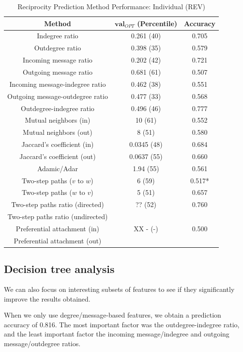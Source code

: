 \documentclass[conference]{IEEEtran}
\begin{document}
\begin{table}[!t]
\renewcommand{\arraystretch}{1.3}
\caption{Reciprocity Prediction Method Performance: Individual (REV)}
\label{table_recresults_indiv}
\centering
\begin{tabular}{|c||c|c|}
\hline
\bf{Method} & $\mathbf{val}_{OPT}$ (Percentile) & \bf{Accuracy} \\
\hline
Indegree ratio & 0.261 (40) & 0.705 \\
Outdegree ratio & 0.398 (35) & 0.579 \\
\hline
Incoming message ratio & 0.202 (42) & 0.721 \\
Outgoing message ratio & 0.681 (61) & 0.507 \\
\hline
Incoming message-indegree ratio & 0.462 (38) & 0.551 \\
Outgoing message-outdegree ratio & 0.477 (33) & 0.568 \\
\hline
Outdegree-indegree ratio & 0.496 (46) & 0.777 \\
\hline
Mutual neighbors (in) & 10 (61) & 0.552 \\
Mutual neighbors (out) & 8 (51) & 0.580 \\
\hline
Jaccard's coefficient (in) & 0.0345 (48) & 0.684 \\
Jaccard's coefficient (out) & 0.0637 (55) & 0.660 \\
\hline
Adamic/Adar & 1.94 (55) & 0.561 \\
\hline
Two-step paths ($v$ to $w$) & 6 (59) & 0.517* \\
Two-step paths ($w$ to $v$) & 5 (51) & 0.657 \\
Two-step paths ratio (directed) & ?? (52) & 0.760 \\
Two-step paths ratio (undirected) &  &  \\
\hline
Preferential attachment (in) & XX - (-) & 0.500 \\
Preferential attachment (out) & &  \\
\hline
\end{tabular}
\end{table}

\subsection{Decision tree analysis}
We can also focus on interesting subsets of features to see if they significantly improve the results obtained.

When we only use degree/message-based features, we obtain a prediction accuracy of 0.816. The most important factor was the outdegree-indegree ratio, and the least important factor the incoming message/indegree and outgoing message/outdegree ratios.
\end{document}
